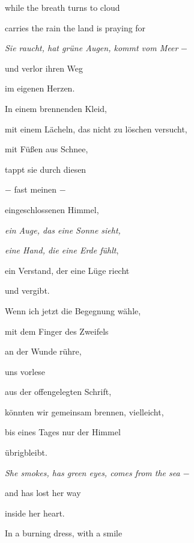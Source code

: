 \documentclass[a4paper]{article}
\begin{document}
\bigskip

while the breath turns to cloud

carries the rain the land is praying for



\bigskip

\textit{Sie raucht, hat grüne Augen, kommt vom Meer} $-$

und verlor ihren Weg 

im eigenen Herzen.


\bigskip

In einem brennenden Kleid,

mit einem Lächeln, das nicht zu löschen versucht,

mit Füßen aus Schnee, 


\bigskip

tappt sie durch diesen 

$-$ fast meinen $-$

eingeschlossenen Himmel,


\bigskip

{\itshape
ein Auge, das eine Sonne sieht,}

\textit{eine Hand, die eine Erde fühlt},

ein Verstand, der eine Lüge riecht


\bigskip

und vergibt.

Wenn ich jetzt die Begegnung wähle,

mit dem Finger des Zweifels


\bigskip

an der Wunde rühre,

uns vorlese 

aus der offengelegten Schrift,


\bigskip

könnten wir gemeinsam brennen, vielleicht,

bis eines Tages nur der Himmel

übrigbleibt.


\bigskip



\bigskip

{\itshape
She smokes, has green eyes, comes from the sea $-$}

and has lost her way

inside her heart.


\bigskip

In a burning dress, with a smile 
\end{document}
